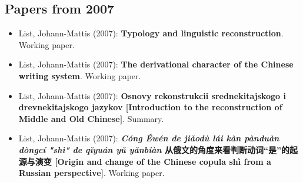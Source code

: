 \subsection{Papers from 2007}
 
\begin{itemize}
\item[] List, Johann-Mattis (2007): \textbf{Typology and linguistic reconstruction}. Working paper.

\item[] List, Johann-Mattis (2007): \textbf{The derivational character of the Chinese writing system}. Working paper.

\item[] List, Johann-Mattis (2007): \textbf{Osnovy rekonstrukcii srednekitajskogo i drevnekitajskogo jazykov [Introduction to the reconstruction of Middle and Old Chinese]}. Summary.

\item[] List, Johann-Mattis (2007): \textbf{\textit{Cóng Éwén de jiǎodù lái kàn pànduàn dòngcí "shì" de qǐyuán yǔ yǎnbiàn} 从俄文的角度来看判断动词“是”的起源与演变 [Origin and change of the Chinese copula shì from a Russian perspective]}. Working paper.

\end{itemize}